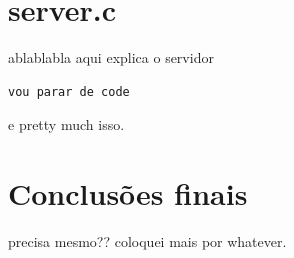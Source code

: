 \documentclass[10pt,twocolumn,letterpaper]{article}
\begin{document}
\section{server.c}
ablablabla aqui explica o servidor

\begin{lstlisting}[caption={aaaaaa}, label=Algorithm]
vou parar de code
\end{lstlisting}

e pretty much isso.

\section{Conclusões finais}

precisa mesmo?? coloquei mais por whatever.

{\small


}
\end{document}

